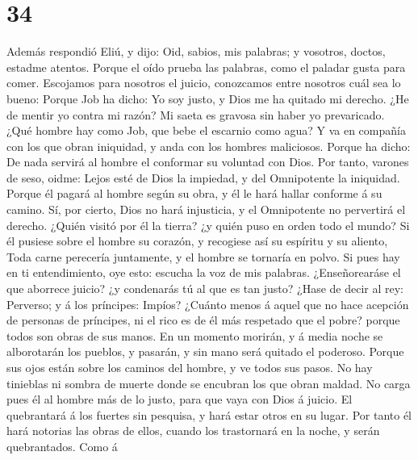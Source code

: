 \hypertarget{section-33}{%
\section{34}\label{section-33}}

 Además respondió Eliú, y dijo:  Oid, sabios,
mis palabras; y vosotros, doctos, estadme atentos.  Porque
el oído prueba las palabras, como el paladar gusta para comer.
 Escojamos para nosotros el juicio, conozcamos entre
nosotros cuál sea lo bueno:  Porque Job ha dicho: Yo soy
justo, y Dios me ha quitado mi derecho.  ¿He de mentir yo
contra mi razón? Mi saeta es gravosa sin haber yo prevaricado.
 ¿Qué hombre hay como Job, que bebe el escarnio como agua?
 Y va en compañía con los que obran iniquidad, y anda con
los hombres maliciosos.  Porque ha dicho: De nada servirá al
hombre el conformar su voluntad con Dios.  Por tanto,
varones de seso, oidme: Lejos esté de Dios la impiedad, y del
Omnipotente la iniquidad.  Porque él pagará al hombre según
su obra, y él le hará hallar conforme á su camino.  Sí, por
cierto, Dios no hará injusticia, y el Omnipotente no pervertirá el
derecho.  ¿Quién visitó por él la tierra? ¿y quién puso en
orden todo el mundo?  Si él pusiese sobre el hombre su
corazón, y recogiese así su espíritu y su aliento,  Toda
carne perecería juntamente, y el hombre se tornaría en polvo.
 Si pues hay en ti entendimiento, oye esto: escucha la voz
de mis palabras.  ¿Enseñorearáse el que aborrece juicio? ¿y
condenarás tú al que es tan justo?  ¿Hase de decir al rey:
Perverso; y á los príncipes: Impíos?  ¿Cuánto menos á aquel
que no hace acepción de personas de príncipes, ni el rico es de él más
respetado que el pobre? porque todos son obras de sus manos.
 En un momento morirán, y á media noche se alborotarán los
pueblos, y pasarán, y sin mano será quitado el poderoso. 
Porque sus ojos están sobre los caminos del hombre, y ve todos sus
pasos.  No hay tinieblas ni sombra de muerte donde se
encubran los que obran maldad.  No carga pues él al hombre
más de lo justo, para que vaya con Dios á juicio.  El
quebrantará á los fuertes sin pesquisa, y hará estar otros en su lugar.
 Por tanto él hará notorias las obras de ellos, cuando los
trastornará en la noche, y serán quebrantados.  Como á
